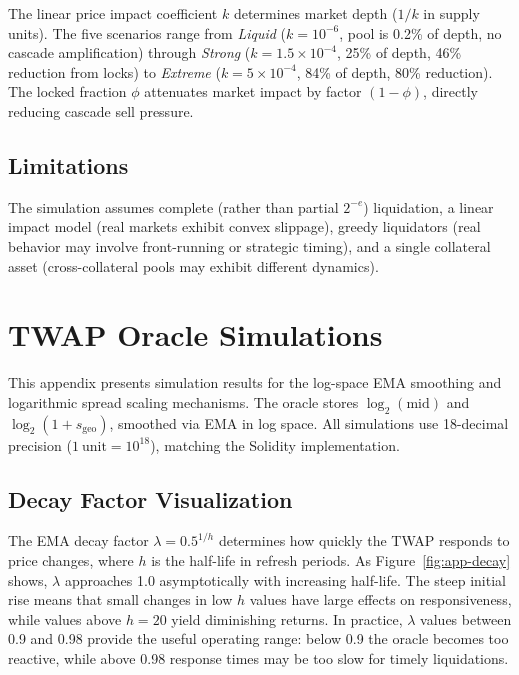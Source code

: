 \documentclass[10pt,a4paper,twocolumn]{article}
\begin{document}
The linear price impact coefficient $k$ determines market depth ($1/k$ in supply units). The five scenarios range from \emph{Liquid} ($k = 10^{-6}$, pool is 0.2\% of depth, no cascade amplification) through \emph{Strong} ($k = 1.5 \times 10^{-4}$, 25\% of depth, 46\% reduction from locks) to \emph{Extreme} ($k = 5 \times 10^{-4}$, 84\% of depth, 80\% reduction). The locked fraction $\phi$ attenuates market impact by factor $(1{-}\phi)$, directly reducing cascade sell pressure.

\subsection{Limitations}

The simulation assumes complete (rather than partial $2^{-e}$) liquidation, a linear impact model (real markets exhibit convex slippage), greedy liquidators (real behavior may involve front-running or strategic timing), and a single collateral asset (cross-collateral pools may exhibit different dynamics).

\section{TWAP Oracle Simulations}
\label{apx:twap-sim}

This appendix presents simulation results for the log-space EMA smoothing and logarithmic spread scaling mechanisms. The oracle stores $\log_2(\text{mid})$ and $\log_2(1 + s_{\text{geo}})$, smoothed via EMA in log space. All simulations use 18-decimal precision ($1\ \text{unit} = 10^{18}$), matching the Solidity implementation.

\subsection{Decay Factor Visualization}

The EMA decay factor $\lambda = 0.5^{1/h}$ determines how quickly the TWAP responds to price changes, where $h$ is the half-life in refresh periods. As Figure~\ref{fig:app-decay} shows, $\lambda$ approaches 1.0 asymptotically with increasing half-life. The steep initial rise means that small changes in low $h$ values have large effects on responsiveness, while values above $h = 20$ yield diminishing returns. In practice, $\lambda$ values between 0.9 and 0.98 provide the useful operating range: below 0.9 the oracle becomes too reactive, while above 0.98 response times may be too slow for timely liquidations.
\end{document}
